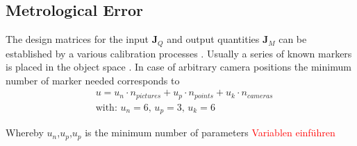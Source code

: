 \documentclass[5p,times,procedia]{elsarticle}
\begin{document}
\subsection{Metrological Error}
\label{error_estimate}
%
The design matrices for the input $\mathbf{J}_{Q}$ and output quantities $\mathbf{J}_{M}$ can be established by a various calibration processes \cite{Hartley2018}. Usually a series of known markers is placed in the object space \cite{Luhmann2003}. In case of arbitrary camera positions the minimum number of marker needed corresponds to
\begin{equation}
	\label{eqn:NumCalibPoints}
	\begin{aligned}
		& 	u = u_n \cdot n_{pictures} + u_p \cdot n_{points} + u_k \cdot n_{cameras} \\
		& \text{with: } u_n = 6\text{, } u_p = 3\text{, } u_k = 6 
	\end{aligned}
\end{equation}

Whereby $u_n$,$u_p$,$u_p$ is the minimum number of parameters
\textcolor{red}{Variablen einführen}
\end{document}
